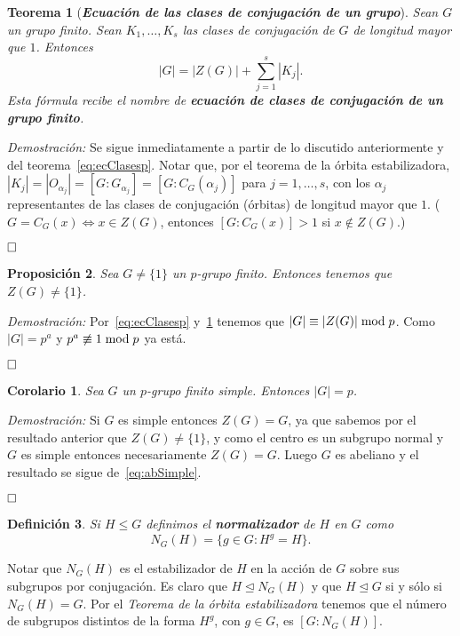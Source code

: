 \documentclass[12pt]{article}
\newtheorem{theorem}{Teorema}[section]
\newtheorem{proposition}[theorem]{Proposición}
\newtheorem{definition}[theorem]{Definición}
\newtheorem{corolario}{Corolario}[theorem]
\begin{document}
\begin{theorem}[\textit{\textbf{Ecuación de las clases de conjugación de un grupo}}] \label{eq:ecClases}
Sean $G$ un grupo finito. Sean $K_{1}, \ldots, K_{s}$ las clases de conjugación de $G$ de longitud mayor que $1$. Entonces $$|G| = |Z(G)| + \sum_{j=1}^{s} |K_{j}|.$$ Esta fórmula recibe el nombre de \textbf{ecuación de clases de conjugación de un grupo finito}.
\end{theorem} 
\emph{Demostración: } Se sigue inmediatamente a partir de lo discutido anteriormente y del teorema~\ref{eq:ecClasesp}. Notar que, por el teorema de la órbita estabilizadora, $|K_{j}| = |O_{\alpha_{j}}| = [G:G_{\alpha_{j}}] = [G:C_{G}(\alpha_{j})]$ para $j=1, \ldots, s$, con los $\alpha_{j}$ representantes de las clases de conjugación (órbitas) de longitud mayor que $1$.   ($G = C_{G}(x) \Longleftrightarrow x \in Z(G)$, entonces $\left[ G:C_{G}(x) \right] > 1$ si $x \notin Z(G)$.)

$\hfill \square$

\begin{proposition}Sea $G \neq \lbrace 1 \rbrace$ un $p$-grupo finito. Entonces tenemos que $Z(G) \neq \lbrace 1 \rbrace$.
\end{proposition}
\emph{Demostración: }Por~\ref{eq:ecClasesp} y~\ref{eq:ecClases} tenemos que $|G| \equiv |Z(G)|\hspace{0.1cm}\text{mod}\hspace{0.1cm} p$. Como $|G| = p^a$ y $p^a \not\equiv 1 \hspace{0.1cm}\text{mod}\hspace{0.1cm}p$ ya está.

$\hfill \square$

\begin{corolario}Sea $G$ un $p$-grupo finito simple. Entonces $|G| = p$.
\end{corolario}
\emph{Demostración: }Si $G$ es simple entonces $Z(G) = G$, ya que sabemos por el resultado anterior que $Z(G) \neq \lbrace 1 \rbrace$, y como el centro es un subgrupo normal y $G$ es simple entonces necesariamente $Z(G) = G$. Luego $G$ es abeliano y el resultado se sigue de~\ref{eq:abSimple}.

$\hfill \square$

\begin{definition}Si $H \leq G$ definimos el \textbf{normalizador} de $H$ en $G$ como $$N_G(H) = \lbrace g \in G : H^g = H \rbrace.$$
\end{definition}

Notar que $N_G(H)$ es el estabilizador de $H$ en la acción de $G$ sobre sus subgrupos por conjugación. Es claro que $H \unlhd N_G(H)$ y que $H \unlhd G$ si y sólo si $N_G(H) =G$. Por el \textit{Teorema de la órbita estabilizadora} tenemos que el número de subgrupos distintos de la forma $H^g$, con $g \in G$, es $[G:N_G(H)]$.
\end{document}
